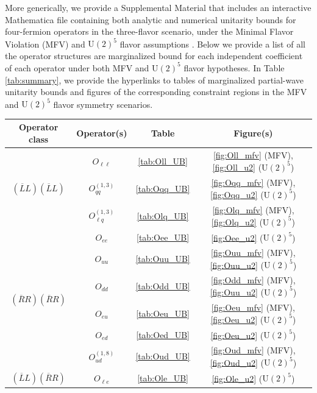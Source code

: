 \documentclass[a4paper,11pt]{article}
\begin{document}
More generically, we provide a Supplemental Material that includes an interactive Mathematica file containing both analytic and numerical unitarity bounds for four-fermion operators in the three-flavor scenario, under the Minimal Flavor Violation (MFV) and $\mathrm{U}(2)^5$ flavor assumptions \cite{Faroughy:2020ina,Greljo:2022cah}. Below we provide a list of all the operator structures are marginalized bound for each independent coefficient of each operator under both MFV and $\mathrm{U}(2)^5$ flavor hypotheses. In Table \ref{tab:summary}, we provide the hyperlinks to tables of marginalized partial-wave unitarity bounds and figures of the corresponding constraint regions in the MFV and $\mathrm{U}(2)^5$ flavor symmetry scenarios.

\begin{table}[h!tb]
\renewcommand{\arraystretch}{1.2}
    \centering
    \begin{tabular}{cccc}
    \toprule
    \rowcolor{hdrcolor} \textbf{Operator class}     & \textbf{Operator(s)} & \textbf{Table} & \textbf{Figure(s)}  \\
    \midrule
    \multirow{3}{*}{\boldmath$(\overline LL)(\overline LL)$}     & $O_{\ell \ell}$ &\ref{tab:Oll_UB} & \ref{fig:Oll_mfv} (MFV), \ref{fig:Oll_u2} ($\mathrm{U}(2)^5$)  \\
    & $O_{qq}^{(1,3)}$ &\ref{tab:Oqq_UB}&\ref{fig:Oqq_mfv} (MFV), \ref{fig:Oqq_u2} ($\mathrm{U}(2)^5$) \\
    & $O_{\ell q}^{(1,3)}$ &\ref{tab:Olq_UB}& \ref{fig:Olq_mfv} (MFV), \ref{fig:Olq_u2} ($\mathrm{U}(2)^5$) \\
    \midrule
    \multirow{6}{*}{\boldmath$(\overline RR)(\overline RR)$} & $O_{ee}$ & \ref{tab:Oee_UB} & \ref{fig:Oee_u2} ($\mathrm{U}(2)^5$)  \\
    & $O_{uu}$ &\ref{tab:Ouu_UB}&\ref{fig:Ouu_mfv} (MFV), \ref{fig:Ouu_u2} ($\mathrm{U}(2)^5$) \\
    & $O_{dd}$ &\ref{tab:Odd_UB}& \ref{fig:Odd_mfv} (MFV), \ref{fig:Ouu_u2} ($\mathrm{U}(2)^5$) \\
    & $O_{eu}$ &\ref{tab:Oeu_UB}& \ref{fig:Oeu_mfv} (MFV), \ref{fig:Oeu_u2} ($\mathrm{U}(2)^5$)  \\
    & $O_{ed}$ &\ref{tab:Oed_UB}&  \ref{fig:Oeu_u2} ($\mathrm{U}(2)^5$) \\
    & $O_{ud}^{(1,8)}$ &\ref{tab:Oud_UB}& \ref{fig:Oud_mfv} (MFV), \ref{fig:Oud_u2} ($\mathrm{U}(2)^5$) \\
    \midrule
    \multirow{6}{*}{\boldmath$(\overline LL)(\overline RR)$} & $O_{\ell e}$ &\ref{tab:Ole_UB} &  \ref{fig:Ole_u2} ($\mathrm{U}(2)^5$)  \\

\end{tabular}
\end{table}
\end{document}
